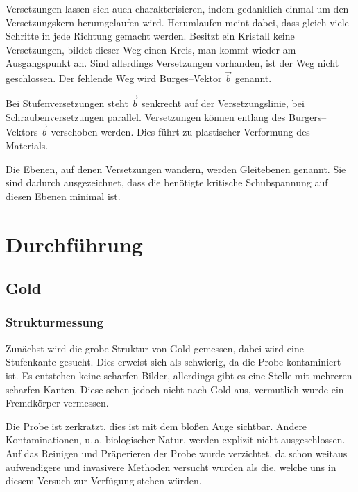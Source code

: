 \documentclass[12pt,a4paper]{scrartcl}
\numberwithin{equation}{section} %
\begin{document}
Versetzungen lassen sich auch charakterisieren, indem gedanklich einmal um den Versetzungskern herumgelaufen wird. Herumlaufen meint dabei, dass gleich viele Schritte in jede Richtung gemacht werden. Besitzt ein Kristall keine Versetzungen, bildet dieser Weg einen Kreis, man kommt wieder am Ausgangspunkt an. Sind allerdings Versetzungen vorhanden, ist der Weg nicht geschlossen. Der fehlende Weg wird Burges--Vektor $\vec{b}$ genannt.

Bei Stufenversetzungen steht $\vec{b}$ senkrecht auf der Versetzungslinie, bei Schraubenversetzungen parallel. \cite{Gross} %
Versetzungen können entlang des Burgers--Vektors $\vec{b}$ verschoben werden. Dies führt zu plastischer Verformung des Materials.

Die Ebenen, auf denen Versetzungen wandern, werden Gleitebenen genannt. Sie sind dadurch ausgezeichnet, dass die benötigte kritische Schubspannung auf diesen Ebenen minimal ist.

\clearpage
\hypertarget{durchfuxfchrung}{%
\section{Durchführung}\label{durchfuxfchrung}}

\hypertarget{gold}{%
\subsection{Gold}\label{gold}}

\hypertarget{strukturmessung}{%
\subsubsection{Strukturmessung}\label{strukturmessung}}

Zunächst wird die grobe Struktur von Gold gemessen, dabei wird eine Stufenkante gesucht. Dies erweist sich als schwierig, da die Probe kontaminiert ist. Es entstehen keine scharfen Bilder, allerdings gibt es eine Stelle mit mehreren scharfen Kanten. Diese sehen jedoch nicht nach Gold aus, vermutlich wurde ein Fremdkörper vermessen.

Die Probe ist zerkratzt, dies ist mit dem bloßen Auge sichtbar. Andere Kontaminationen, u.\,a. biologischer Natur, werden explizit nicht ausgeschlossen. Auf das Reinigen und Präperieren der Probe wurde verzichtet, da schon weitaus aufwendigere und invasivere Methoden versucht wurden als die, welche uns in diesem Versuch zur Verfügung stehen würden.
\end{document}
